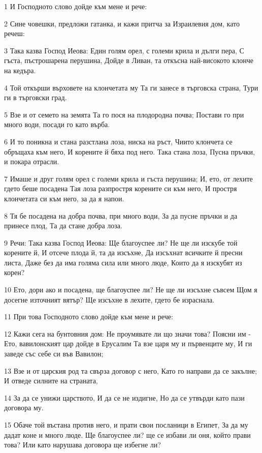 \par 1 И Господното слово дойде към мене и рече:
\par 2 Сине човешки, предложи гатанка, и кажи притча за Израилевия дом, като речеш:
\par 3 Така казва Господ Иеова: Един голям орел, с големи крила и дълги пера, С гъста, пъстрошарена перушина, Дойде в Ливан, та откъсна най-високото клонче на кедъра.
\par 4 Той откърши върховете на клончетата му Та ги занесе в търговска страна, Тури ги в търговски град.
\par 5 Взе и от семето на земята Та го пося на плодородна почва; Постави го при много води, посади го като върба.
\par 6 И то поникна и стана разстлана лоза, ниска на ръст, Чиито клончета се обръщаха към него, И корените й бяха под него. Така стана лоза, Пусна пръчки, и покара отрасли.
\par 7 Имаше и друг голям орел с големи крила и гъста перушина; И, ето, от лехите гдето беше посадена Тая лоза разпростря корените си към него, И простря клончетата си към него, за да я напои.
\par 8 Тя бе посадена на добра почва, при много води, За да пусне пръчки и да принесе плод, Та да стане добра лоза.
\par 9 Речи: Така казва Господ Иеова: Ще благоуспее ли? Не ще ли изскубе той корените й, И отсече плода й, та да изсъхне, Да изсъхнат всичките й пресни листа, Даже без да има голяма сила или много люде, Които да я изскубят из корен?
\par 10 Ето, дори ако и посадена, ще благоуспее ли? Не ще ли изсъхне съвсем Щом я досегне източният вятър? Ще изсъхне в лехите, гдето бе израснала.
\par 11 При това Господното слово дойде към мене и рече:
\par 12 Кажи сега на бунтовния дом: Не проумявате ли що значи това? Поясни им - Ето, вавилонският цар дойде в Ерусалим Та взе царя му и първенците му, И ги заведе със себе си във Вавилон;
\par 13 Взе и от царския род та свърза договор с него, Като го направи да се закълне; И отведе силните на страната,
\par 14 За да се унижи царството, И да се не издигне, Но да се утвърди като пази договора му.
\par 15 Обаче той въстана против него, и прати свои посланици в Египет, За да му дадат коне и много люде. Ще благоуспее ли? ще се избави ли оня, който прави това? Или като нарушава договора ще избегне ли?
